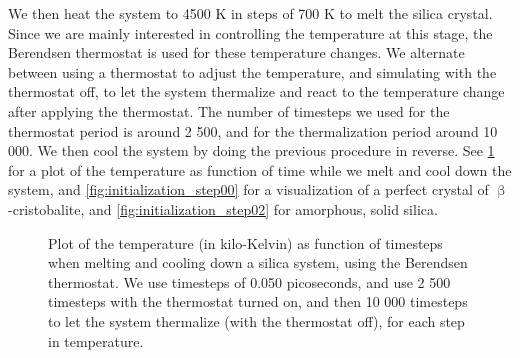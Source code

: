 We then heat the system to 4500 K in steps of 700 K to melt the silica crystal. Since we are mainly interested in controlling the temperature at this stage, the Berendsen thermostat is used for these temperature changes. We alternate between using a thermostat to adjust the temperature, and simulating with the thermostat off, to let the system thermalize and react to the temperature change after applying the thermostat. The number of timesteps we used for the thermostat period is around 2 500, and for the thermalization period around 10 000. We then cool the system by doing the previous procedure in reverse. See \cref{fig:plot_heat_melt_sio2} for a plot of the temperature as function of time while we melt and cool down the system, and \cref{fig:initialization_step00} for a visualization of a perfect crystal of $\upbeta$-cristobalite, and \cref{fig:initialization_step02} for amorphous, solid silica.%
%
\begin{figure}[htpb]%
    \centering%
    \caption{%
        Plot of the temperature (in kilo-Kelvin) as function of timesteps when melting and cooling down a silica system, using the Berendsen thermostat. We use timesteps of 0.050 picoseconds, and use 2 500 timesteps with the thermostat turned on, and then 10 000 timesteps to let the system thermalize (with the thermostat off), for each step in temperature. %
        \label{fig:plot_heat_melt_sio2}%
    }%
\end{figure}%
%

